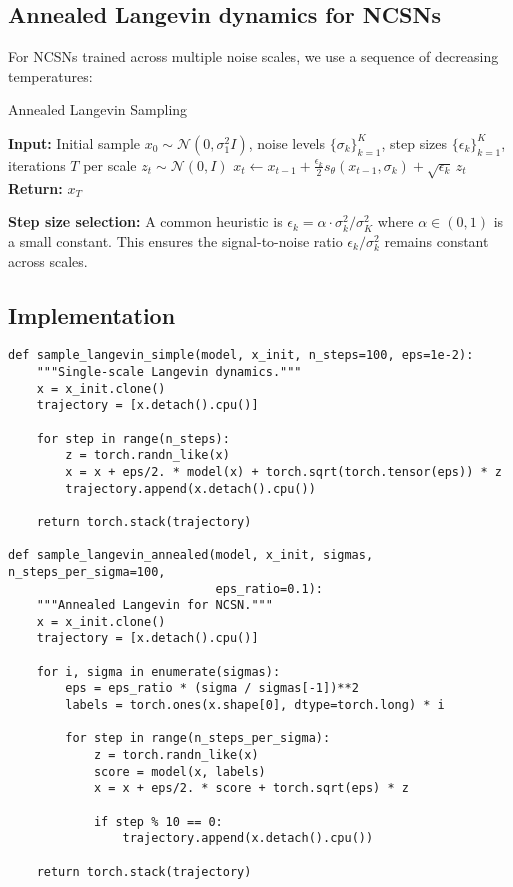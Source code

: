 \documentclass[11pt]{article}
\theoremstyle{definition}
\begin{document}
\subsection{Annealed Langevin dynamics for NCSNs}
For NCSNs trained across multiple noise scales, we use a sequence of decreasing temperatures:

\begin{algorithm}
\caption{Annealed Langevin Sampling}
\begin{algorithmic}[1]
\STATE \textbf{Input:} Initial sample $x_0 \sim \mathcal{N}(0, \sigma_1^2 I)$, noise levels $\{\sigma_k\}_{k=1}^K$, 
step sizes $\{\epsilon_k\}_{k=1}^K$, iterations $T$ per scale
        \STATE $z_t \sim \mathcal{N}(0, I)$
        \STATE $x_{t} \leftarrow x_{t-1} + \frac{\epsilon_k}{2} s_\theta(x_{t-1}, \sigma_k) + \sqrt{\epsilon_k}\, z_t$
    \ENDFOR
\ENDFOR
\STATE \textbf{Return:} $x_T$
\end{algorithmic}
\end{algorithm}

\textbf{Step size selection:} A common heuristic is $\epsilon_k = \alpha \cdot \sigma_k^2 / \sigma_K^2$ 
where $\alpha \in (0, 1)$ is a small constant. 
This ensures the signal-to-noise ratio $\epsilon_k / \sigma_k^2$ remains constant across scales.

\subsection{Implementation}
\begin{lstlisting}[style=py,caption={Langevin sampling implementations}]
def sample_langevin_simple(model, x_init, n_steps=100, eps=1e-2):
    """Single-scale Langevin dynamics."""
    x = x_init.clone()
    trajectory = [x.detach().cpu()]
    
    for step in range(n_steps):
        z = torch.randn_like(x)
        x = x + eps/2. * model(x) + torch.sqrt(torch.tensor(eps)) * z
        trajectory.append(x.detach().cpu())
    
    return torch.stack(trajectory)

def sample_langevin_annealed(model, x_init, sigmas, n_steps_per_sigma=100, 
                             eps_ratio=0.1):
    """Annealed Langevin for NCSN."""
    x = x_init.clone()
    trajectory = [x.detach().cpu()]
    
    for i, sigma in enumerate(sigmas):
        eps = eps_ratio * (sigma / sigmas[-1])**2
        labels = torch.ones(x.shape[0], dtype=torch.long) * i
        
        for step in range(n_steps_per_sigma):
            z = torch.randn_like(x)
            score = model(x, labels)
            x = x + eps/2. * score + torch.sqrt(eps) * z
            
            if step % 10 == 0:
                trajectory.append(x.detach().cpu())
    
    return torch.stack(trajectory)
\end{lstlisting}
\end{document}
